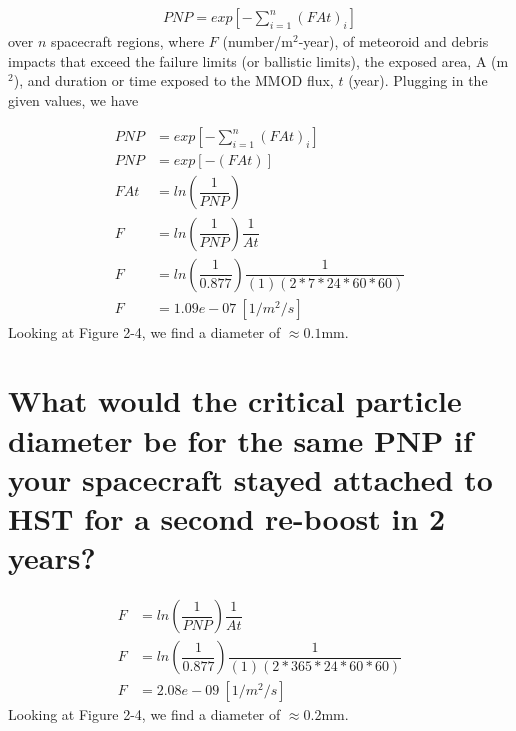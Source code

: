 \documentclass[onecolumn,10pt]{jhwhw}
\begin{document}
\begin{align*}
  PNP = exp\left[- \sum^{n}_{i=1} \left(F A t\right)_i \right]
\end{align*}
over $n$ spacecraft regions, where $F$ (number/m$^2$-year), of meteoroid and debris impacts that exceed the failure limits (or ballistic limits), the exposed area, A (m$^2$), and duration or time exposed to the MMOD flux, $t$ (year). Plugging in the given values, we have

\begin{align*}
  PNP &= exp\left[- \sum^{n}_{i=1} \left(F A t\right)_i \right] \\
  PNP &= exp\left[- (F A t) \right] \\
  FAt &= ln(\dfrac{1}{PNP})\\
F &= ln(\dfrac{1}{PNP}) \dfrac{1}{At}\\
F &= ln(\dfrac{1}{0.877}) \dfrac{1}{(1)(2*7*24*60*60)}\\
F &= 1.09e-07~[1/m^2/s]
\end{align*}
\noindent Looking at Figure 2-4, we find a diameter of $\approx 0.1$mm.
\part{What would the critical particle diameter be for the same PNP if your spacecraft stayed attached to HST for a second re-boost in 2 years?}
\begin{align*}
F &= ln(\dfrac{1}{PNP}) \dfrac{1}{At}\\
F &= ln(\dfrac{1}{0.877}) \dfrac{1}{(1)(2*365*24*60*60)}\\
F &= 2.08e-09~[1/m^2/s]
\end{align*}
\noindent Looking at Figure 2-4, we find a diameter of $\approx 0.2$mm.
\end{document}
